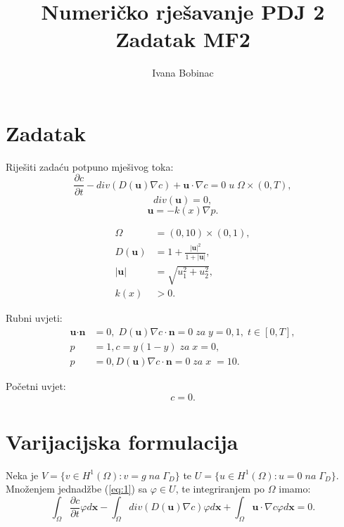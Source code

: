 \documentclass[a4paper,12pt]{article}
\title{Numeričko rješavanje PDJ 2 \\
Zadatak MF2}
\author{Ivana Bobinac}
\date{ }
\begin{document}
\maketitle

\section{Zadatak}
Riješiti zadaću potpuno mješivog toka:
\begin{equation} \label{eq:1}
\frac{\partial c}{\partial t} - div( D(\textbf{u}) \nabla c ) + \textbf{u} \cdot \nabla c = 0 \; u \; \Omega \times (0,T),
\end{equation}
\begin{equation} \label{eq:2}
div(\textbf{u}) = 0,
\end{equation}
\begin{equation} \label{eq:3}
\textbf{u} = -\textit{k}(x) \nabla p.
\end{equation}

\begin{align*}
\Omega &= (0,10) \times (0,1), \\
D(\textbf{u}) &= 1 + \frac{|\textbf{u}|^2}{1 + |\textbf{u}|}, \\
|\textbf{u}| &= \sqrt{u_1^2 + u_2^2}, \\
k(x) &> 0.
\end{align*}

Rubni uvjeti:
\begin{align*}
\textbf{u} \cdot \textbf{n} &= 0, \; D(\textbf{u}) \nabla c \cdot \textbf{n} = 0 \; za \; y = 0,1, \; t \in [0,T], \\
p &= 1, c = y(1-y) \; za \; x = 0, \\
p &= 0, D(\textbf{u}) \nabla c \cdot \textbf{n} = 0 \; za \; x \; = 10.
\end{align*}

Početni uvjet:
\begin{equation*}
c = 0.
\end{equation*}

\section{Varijacijska formulacija}
Neka je $V = \{ v \in H^1(\Omega) : v = g \; na \; \Gamma_D \}$ te $U = \{ u \in H^1(\Omega) : u = 0 \; na \; \Gamma_D \}$. Množenjem jednadžbe (\ref{eq:1}) sa $\varphi \in U$, te integriranjem po $\Omega$ imamo:
\begin{equation*}
\int_{\Omega} \frac{\partial c}{\partial t} \varphi d\textbf{x} - \int_{\Omega} div(D(\textbf{u}) \nabla c) \varphi d\textbf{x} + \int_{\Omega} \textbf{u} \cdot \nabla c \varphi d\textbf{x} = 0.
\end{equation*}
\end{document}
